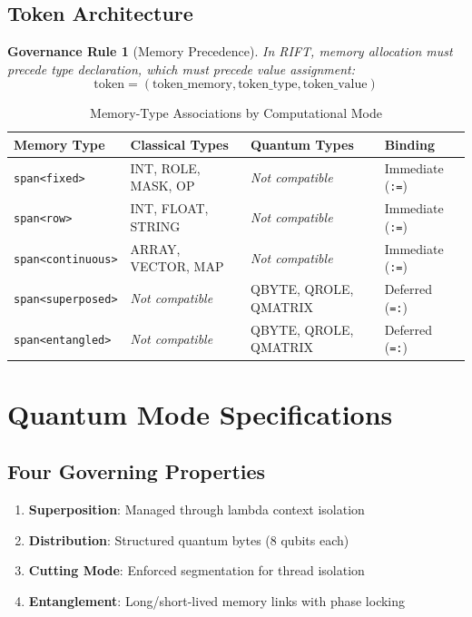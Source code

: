\documentclass[12pt]{article}
\newtheorem{governance}{Governance Rule}
\begin{document}
\subsection{Token Architecture}
\begin{governance}[Memory Precedence]
In RIFT, memory allocation must precede type declaration, which must precede value assignment:
\[
\text{token} = (\text{token\_memory}, \text{token\_type}, \text{token\_value})
\]
\end{governance}

\begin{table}[H]
\centering
\caption{Memory-Type Associations by Computational Mode}
\begin{tabular}{|l|l|l|l|}
\hline
\textbf{Memory Type} & \textbf{Classical Types} & \textbf{Quantum Types} & \textbf{Binding} \\
\hline
\texttt{span<fixed>} & INT, ROLE, MASK, OP & \textit{Not compatible} & Immediate (\texttt{:=}) \\
\hline
\texttt{span<row>} & INT, FLOAT, STRING & \textit{Not compatible} & Immediate (\texttt{:=}) \\
\hline
\texttt{span<continuous>} & ARRAY, VECTOR, MAP & \textit{Not compatible} & Immediate (\texttt{:=}) \\
\hline
\texttt{span<superposed>} & \textit{Not compatible} & QBYTE, QROLE, QMATRIX & Deferred (\texttt{=:}) \\
\hline
\texttt{span<entangled>} & \textit{Not compatible} & QBYTE, QROLE, QMATRIX & Deferred (\texttt{=:}) \\
\hline
\end{tabular}
\end{table}

\section{Quantum Mode Specifications}

\subsection{Four Governing Properties}
\begin{enumerate}
\item \textbf{Superposition}: Managed through lambda context isolation
\item \textbf{Distribution}: Structured quantum bytes (8 qubits each)
\item \textbf{Cutting Mode}: Enforced segmentation for thread isolation
\item \textbf{Entanglement}: Long/short-lived memory links with phase locking
\end{enumerate}
\end{document}
